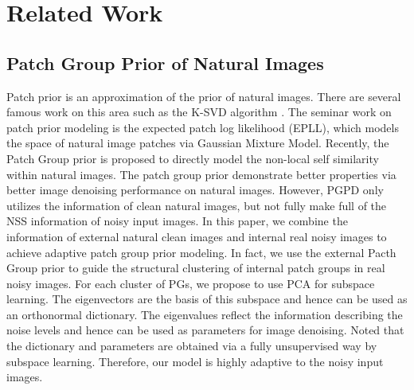 \documentclass[10pt,twocolumn,letterpaper]{article}
\begin{document}
\section{Related Work}
\subsection{Patch Group Prior of Natural Images}
Patch prior is an approximation of the prior of natural images. There are several famous work on this area such as the K-SVD algorithm \cite{ksvd}. The seminar work on patch prior modeling is the expected patch log likelihood (EPLL), which models the space of natural image patches via Gaussian Mixture Model. Recently, the Patch Group prior \cite{pgpd} is proposed to directly model the non-local self similarity within natural images. The patch group prior demonstrate better properties via better image denoising performance on natural images. However, PGPD only utilizes the information of clean natural images, but not fully make full of the NSS information of noisy input images. In this paper, we combine the information of external natural clean images and internal real noisy images to achieve adaptive patch group prior modeling. In fact, we use the external Pacth Group prior to guide the structural clustering of internal patch groups in real noisy images. For each cluster of PGs, we propose to use PCA for subspace learning. The eigenvectors are the basis of this subspace and hence can be used as an orthonormal dictionary. The eigenvalues reflect the information describing the noise levels and hence can be used as parameters for image denoising. Noted that the dictionary and parameters are obtained via a fully unsupervised way by subspace learning. Therefore, our model is highly adaptive to the noisy input images.
\end{document}
